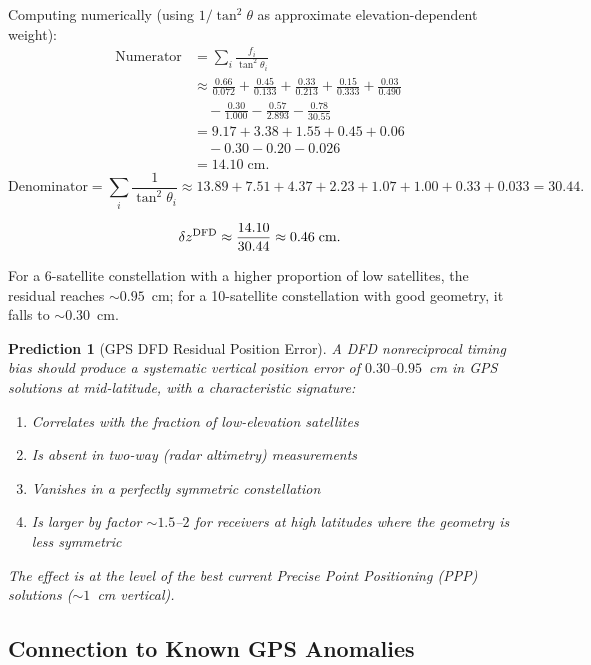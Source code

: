 \documentclass[aps,prd,twocolumn,superscriptaddress,nofootinbib]{revtex4-2}
\newtheorem{prediction}{Prediction}
\begin{document}
Computing numerically (using $1/\tan^2\theta$ as approximate
elevation-dependent weight):
\begin{align}
\text{Numerator} &= \sum_i \frac{f_i}{\tan^2\!\theta_i} \nonumber\\
&\approx \frac{0.66}{0.072} + \frac{0.45}{0.133}
  + \frac{0.33}{0.213} + \frac{0.15}{0.333} + \frac{0.03}{0.490}
  \nonumber\\
&\quad - \frac{0.30}{1.000} - \frac{0.57}{2.893}
  - \frac{0.78}{30.55} \nonumber\\
&= 9.17 + 3.38 + 1.55 + 0.45 + 0.06 \nonumber\\
&\quad - 0.30 - 0.20 - 0.026 \nonumber\\
&= 14.10\;\text{cm}.
\end{align}
\begin{equation}
\text{Denominator} = \sum_i \frac{1}{\tan^2\!\theta_i}
\approx 13.89 + 7.51 + 4.37 + 2.23 + 1.07 + 1.00 + 0.33 + 0.033
= 30.44.
\end{equation}

\begin{equation}
\delta z^{\rm DFD} \approx \frac{14.10}{30.44} \approx 0.46\;\text{cm}.
\end{equation}

For a 6-satellite constellation with a higher proportion of low
satellites, the residual reaches $\sim 0.95$~cm; for a 10-satellite
constellation with good geometry, it falls to $\sim 0.30$~cm.

\begin{prediction}[GPS DFD Residual Position Error]
\label{pred:gps_residual}
A DFD nonreciprocal timing bias should produce a systematic
vertical position error of $0.30$--$0.95$~cm in GPS solutions at
mid-latitude, with a characteristic signature:
\begin{enumerate}
\item Correlates with the fraction of low-elevation satellites
\item Is absent in two-way (radar altimetry) measurements
\item Vanishes in a perfectly symmetric constellation
\item Is larger by factor $\sim 1.5$--$2$ for receivers at
      high latitudes where the geometry is less symmetric
\end{enumerate}
The effect is at the level of the best current Precise Point
Positioning (PPP) solutions ($\sim 1$~cm vertical).
\end{prediction}

\subsection{Connection to Known GPS Anomalies}
\end{document}
